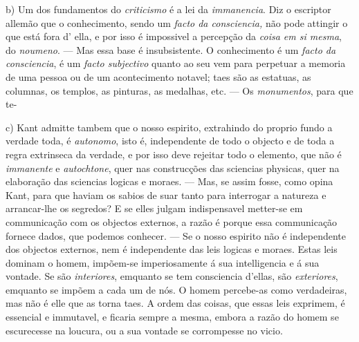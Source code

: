 b) Um dos fundamentos do \emph{criticismo} é a lei da \emph{immanencia}. Diz o escriptor allemão que o conhecimento, sendo um \emph{facto da consciencia,} não pode attingir o que está fora d' ella, e por isso é impossivel a percepção da \emph{coisa em si mesma}, do \emph{noumeno}. --- Mas essa base é insubsistente. O conhecimento é um \emph{facto da consciencia}, é um \emph{facto subjectivo} quanto ao seu   vem para perpetuar a memoria de uma pessoa ou de um acontecimento notavel; taes são as estatuas, as columnas, os templos, as pinturas, as medalhas, etc. --- Os \emph{monumentos}, para que te-

c) Kant admitte tambem que o nosso espirito, extrahindo do proprio fundo a verdade toda, é \emph{autonomo}, isto é, independente de todo o objecto e de toda a regra extrinseca da verdade, e por isso deve rejeitar todo o elemento, que não é \emph{immanente} e \emph{autochtone}, quer nas construcções das sciencias physicas, quer na elaboração das sciencias logicas e moraes. --- Mas, se assim fosse, como opina Kant, para que haviam os sabios de suar tanto para interrogar a natureza e arrancar-lhe os segredos? E se elles julgam indispensavel metter-se em communicação com os objectos externos, a razão é porque essa communicação fornece dados, que podemos conhecer. --- Se o nosso espirito não é independente dos objectos externos, nem é independente das leis logicas e moraes. Estas leis dominam o homem, impõem-se imperiosamente á sua intelligencia e á sua vontade. Se são \emph{interiores}, emquanto se tem consciencia d'ellas, são \emph{exteriores}, emquanto se impõem a cada um de nós. O homem percebe-as como verdadeiras, mas não é elle que as torna taes. A ordem das coisas, que essas leis exprimem, é essencial e immutavel, e ficaria sempre a mesma, embora a razão do homem se escurecesse na loucura, ou a sua vontade se corrompesse no vicio.

